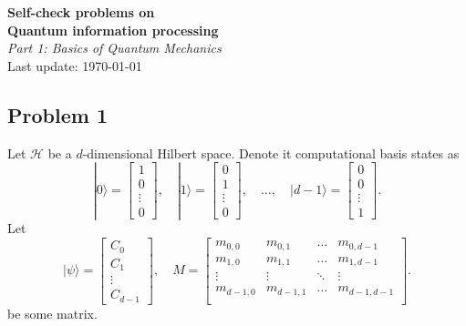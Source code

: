 \documentclass[a4paper,10pt]{article}
\newcommand{\ket}[1]{|#1\rangle}
\begin{document}
\begin{center}
\Large{{\bf Self-check problems on\\  Quantum information processing}\\{\it Part 1: Basics of Quantum Mechanics}}\\
\vspace{5pt}
\large{Last update: \today}
\end{center}

\subsection*{Problem 1}
Let $\mathcal{H}$ be a $d$-dimensional Hilbert space.
Denote it computational basis states as
\begin{equation}
	\ket{0} = \begin{bmatrix}
	1 \\ 0 \\ \vdots \\ 0
	\end{bmatrix}, \quad 
	\ket{1} = \begin{bmatrix}
	0 \\ 1 \\ \vdots \\ 0
	\end{bmatrix}, \quad
	\ldots, \quad
	\ket{d-1} = \begin{bmatrix}
	0 \\ 0 \\ \vdots \\ 1
	\end{bmatrix}.
\end{equation}
Let
\begin{equation}
	\ket{\psi} = \begin{bmatrix}
		C_0 \\ C_1 \\ \vdots \\C_{d-1}
	\end{bmatrix}, \quad
	M = \begin{bmatrix}
		m_{0,0} & m_{0,1} & \ldots & m_{0,d-1} \\
		m_{1,0} & m_{1,1} & \ldots & m_{1,d-1} \\		
		\vdots & \vdots & \ddots & \vdots \\		
		m_{d-1,0} & m_{d-1,1} & \ldots & m_{d-1,d-1} \\		
	\end{bmatrix}.
\end{equation}
be some matrix.
\end{document}
